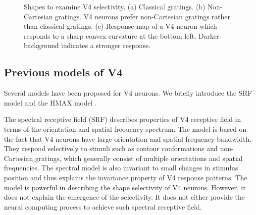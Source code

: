 \documentclass[10pt]{article}
\begin{document}
\begin{figure}
\centering
{}\hfil
{}\hfil
{}
\caption{Shapes to examine V4 selectivity.
(a) Classical gratings.
(b) Non-Cartesian gratings. V4 neurons prefer non-Cartesian gratings rather than classical gratings.
(c) Response map of a V4 neuron which responds to a sharp convex curvature at the bottom left.
Darker background indicates a stronger response.}
\label{fig:2}
\end{figure}

\subsection{Previous models of V4}

Several models have been proposed for V4 neurons.
We briefly introduce the SRF model \cite{david2006} and the HMAX model \cite{riesenhuber1999,cadieu2007}.

The spectral receptive field (SRF) \cite{david2006}
describes properties of V4 receptive field in terms of the orientation and spatial frequency spectrum.
The model is based on the fact that V4 neurons have large orientation and spatial frequency bandwidth.
They respond selectively to stimuli such as contour conformations and non-Cartesian gratings,
which generally consist of multiple orientations and spatial frequencies.
The spectral model is also invariant to small changes in stimulus position 
and thus explains the invariance property of V4 response patterns.
The model is powerful in describing the shape selectivity of V4 neurons.
However, it does not explain the emergence of the selectivity.
It does not either provide the neural computing process to achieve such spectral receptive field.
\end{document}
